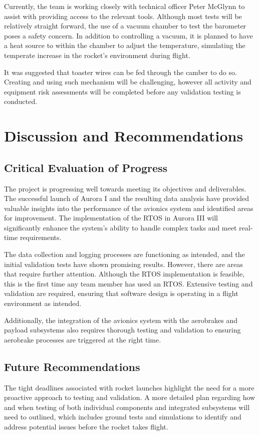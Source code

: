 Currently, the team is working closely with technical officer Peter McGlynn to assist with providing access to the relevant tools. Although most tests will be relatively straight forward, the use of a vacuum chamber to test the barometer poses a safety concern. In addition to controlling a vacuum, it is planned to have a heat source to within the chamber to adjust the temperature, simulating the temperate increase in the rocket’s environment during flight. 

It was suggested that toaster wires can be fed through the camber to do so. Creating and using such mechanism will be challenging, however all activity and equipment risk assessments will be completed before any validation testing is conducted.  

\section{Discussion and Recommendations}

\subsection{Critical Evaluation of Progress}
The project is progressing well towards meeting its objectives and deliverables. The successful launch of Aurora I and the resulting data analysis have provided valuable insights into the performance of the avionics system and identified areas for improvement. The implementation of the RTOS in Aurora III will significantly enhance the system's ability to handle complex tasks and meet real-time requirements. 

The data collection and logging processes are functioning as intended, and the initial validation tests have shown promising results. However, there are areas that require further attention. Although the RTOS implementation is feasible, this is the first time any team member has used an RTOS. Extensive testing and validation are required, ensuring that software design is operating in a flight environment as intended. 

Additionally, the integration of the avionics system with the aerobrakes and payload subsystems also requires thorough testing and validation to ensuring aerobrake processes are triggered at the right time.  

\subsection{Future Recommendations}
The tight deadlines associated with rocket launches highlight the need for a more proactive approach to testing and validation. A more detailed plan regarding how and when testing of both individual components and integrated subsystems will need to outlined, which includes ground tests and simulations to identify and address potential issues before the rocket takes flight. 

